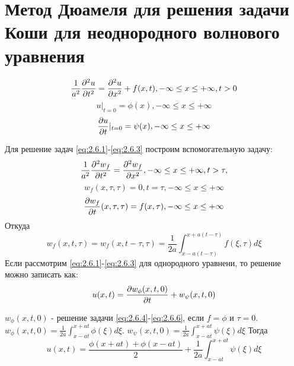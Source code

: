 \documentclass[../main.tex]{subfiles}
\begin{document}
\section{Метод Дюамеля для решения задачи Коши для неоднородного волнового уравнения}

\begin{equation}
	\label{eq:2.6.1}
	\frac{1}{a^2}\frac{\partial ^2u}{\partial t^2} = \frac{\partial ^2u}{\partial x^2} + f(x, t), -\infty \leq x \leq +\infty, t > 0
\end{equation}
\begin{equation}
	\label{eq:2.6.2}
	u|_{t=0} = \phi(x), -\infty \leq x \leq +\infty
\end{equation}
\begin{equation}
	\label{eq:2.6.3}
	\frac{\partial u}{\partial t}|_{t=0}=\psi(x), -\infty \leq x \leq +\infty
\end{equation}

Для решение задач \eqref{eq:2.6.1}-\eqref{eq:2.6.3} построим вспомогательную задачу:
\begin{equation}
	\label{eq:2.6.4}
	\frac{1}{a^2}\frac{\partial ^2w_f}{\partial t^2}=\frac{\partial ^2w_f}{\partial x^2}, -\infty \leq x \leq +\infty, t > \tau,
\end{equation}
\begin{equation}
	\label{eq:2.6.5}
	w_f(x, \tau, \tau) = 0, t = \tau, -\infty \leq x \leq +\infty
\end{equation}
\begin{equation}
	\label{eq:2.6.6}
	\frac{\partial w_f}{\partial t}(x, \tau, \tau) = f(x, \tau), -\infty \leq x \leq +\infty
\end{equation}
Откуда
$$
	w_f(x, t, \tau)=w_f(x, t-\tau,\tau) = \frac{1}{2a}\int_{x-a(t-\tau)}^{x+a(t-\tau)}f(\xi, \tau)d\xi
$$
Если рассмотрим \eqref{eq:2.6.1}-\eqref{eq:2.6.3} для однородного уравнени, то решение можно записать как:
\begin{equation}
	u(x, t)=\frac{\partial w_\phi(x, t, 0)}{\partial t} + w_\psi(x, t, 0)
\end{equation}

$w_\phi(x, t, 0)$ - решение задачи \eqref{eq:2.6.4}-\eqref{eq:2.6.6},
если $f = \phi$ и $\tau = 0$.
$w_\phi(x, t, 0) = \frac{1}{2a}\int_{x-at}^{x+at}\phi(\xi)d\xi$.
$w_\psi(x, t, 0) = \frac{1}{2a}\int_{x-at}^{x+at}\psi(\xi)d\xi$
Тогда
\begin{equation}
	u(x, t) = \frac{\phi(x+at) + \phi(x - at)}{2} + \frac{1}{2a}\int_{x - at}^{x+at}\psi(\xi)d\xi
\end{equation}
\end{document}
